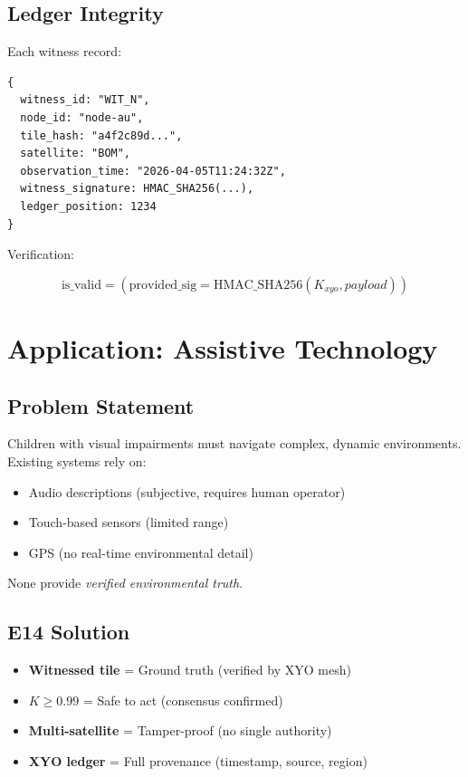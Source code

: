 \documentclass[11pt]{article}
\begin{document}
\subsection{Ledger Integrity}

Each witness record:

\begin{lstlisting}
{
  witness_id: "WIT_N",
  node_id: "node-au",
  tile_hash: "a4f2c89d...",
  satellite: "BOM",
  observation_time: "2026-04-05T11:24:32Z",
  witness_signature: HMAC_SHA256(...),
  ledger_position: 1234
}
\end{lstlisting}

Verification:

\begin{equation}
\text{is\_valid} = (\text{provided\_sig} = \text{HMAC\_SHA256}(K_{xyo}, payload))
\end{equation}

\section{Application: Assistive Technology}

\subsection{Problem Statement}

Children with visual impairments must navigate complex, dynamic environments. Existing systems rely on:
\begin{itemize}
    \item Audio descriptions (subjective, requires human operator)
    \item Touch-based sensors (limited range)
    \item GPS (no real-time environmental detail)
\end{itemize}

None provide \textit{verified environmental truth}.

\subsection{E14 Solution}

\begin{itemize}
    \item \textbf{Witnessed tile} = Ground truth (verified by XYO mesh)
    \item \textbf{$K \geq 0.99$} = Safe to act (consensus confirmed)
    \item \textbf{Multi-satellite} = Tamper-proof (no single authority)
    \item \textbf{XYO ledger} = Full provenance (timestamp, source, region)
\end{itemize}
\end{document}
